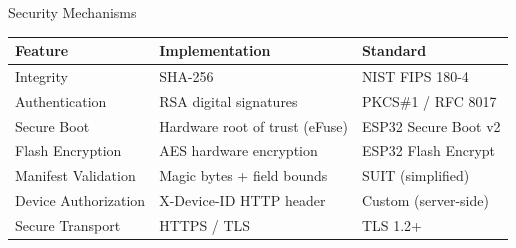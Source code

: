 \documentclass[aspectratio=169]{beamer}
\begin{document}
\begin{frame}{Security Mechanisms}

\renewcommand{\arraystretch}{1.25}
\begin{table}
\centering
\small
\begin{tabular}{l l l}
\toprule
\textbf{Feature} & \textbf{Implementation} & \textbf{Standard} \\
\midrule
Integrity & SHA-256 & NIST FIPS 180-4 \\
Authentication & RSA digital signatures & PKCS\#1 / RFC 8017 \\
Secure Boot & Hardware root of trust (eFuse) & ESP32 Secure Boot v2 \\
Flash Encryption & AES hardware encryption & ESP32 Flash Encrypt \\
Manifest Validation & Magic bytes + field bounds & SUIT (simplified) \\
Device Authorization & X-Device-ID HTTP header & Custom (server-side) \\
Secure Transport & HTTPS / TLS & TLS 1.2+ \\
\bottomrule
\end{tabular}
\end{table}

\end{frame}
\end{document}
